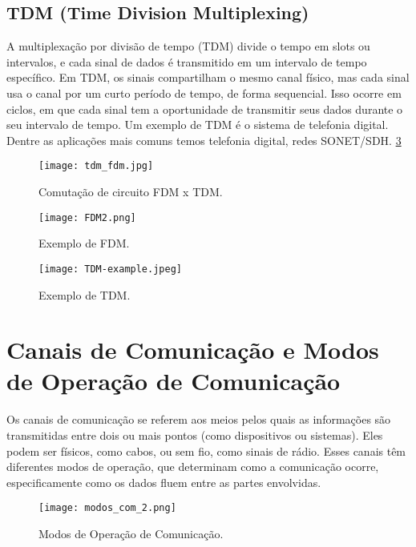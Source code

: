 \documentclass[12pt]{article}
\begin{document}
\subsection{TDM (Time Division Multiplexing)}
A multiplexação por divisão de tempo (TDM) divide o tempo em slots ou intervalos, e cada sinal de dados é transmitido em um intervalo de tempo específico. Em TDM, os sinais compartilham o mesmo canal físico, mas cada sinal usa o canal por um curto período de tempo, de forma sequencial. Isso ocorre em ciclos, em que cada sinal tem a oportunidade de transmitir seus dados durante o seu intervalo de tempo. Um exemplo de TDM é o sistema de telefonia digital. Dentre as aplicações mais comuns temos telefonia digital, redes SONET/SDH. \ref{fig:Figura6} \cite{promader2015}

\begin{figure}[H]
    \centering
    \texttt{[image: tdm\_fdm.jpg]}
    \caption{Comutação de circuito FDM x TDM.}
    \label{fig:Figura4}
\end{figure}

\begin{figure}[H]
    \centering
    \texttt{[image: FDM2.png]}
    \caption{Exemplo de FDM.}
    \label{fig:Figura5}
\end{figure}

\begin{figure}[H]
    \centering
    \texttt{[image: TDM-example.jpeg]}
    \caption{Exemplo de TDM.}
    \label{fig:Figura6}
\end{figure}

\section{Canais de Comunicação e Modos de Operação de Comunicação}
Os canais de comunicação se referem aos meios pelos quais as informações são transmitidas entre dois ou mais pontos (como dispositivos ou sistemas). Eles podem ser físicos, como cabos, ou sem fio, como sinais de rádio. Esses canais têm diferentes modos de operação, que determinam como a comunicação ocorre, especificamente como os dados fluem entre as partes envolvidas. \cite{galvao2024}

\begin{figure}[H]
    \centering
    \texttt{[image: modos\_com\_2.png]}
    \caption{Modos de Operação de Comunicação.}
    \label{fig:Figura7}
\end{figure}
\end{document}
